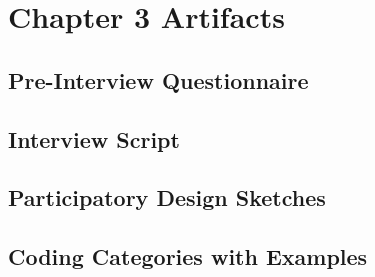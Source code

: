 \chapter{Chapter 3 Artifacts}
\label{chap3:artifacts}

\begin{appendices}

\section{Pre-Interview Questionnaire}



\section{Interview Script}


% 

\section{Participatory Design Sketches}




\section{Coding Categories with Examples}



\end{appendices}